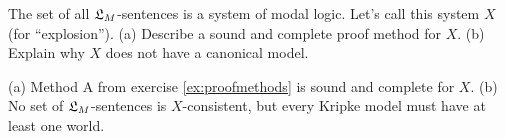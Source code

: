 


\begin{exercise}
  The set of all $\mathfrak{L}_{M}$-sentences is a system of modal logic. Let's call this
  system $X$ (for ``explosion''). (a) Describe a sound and complete proof method
  for $X$. (b) Explain why $X$ does not have a canonical model.
\end{exercise}
\begin{solution}
  (a) Method A from exercise \ref{ex:proofmethods} is sound and complete for
  $X$. (b) No set of $\mathfrak{L}_{M}$-sentences is $X$-consistent, but every Kripke model
  must have at least one world.
\end{solution}



